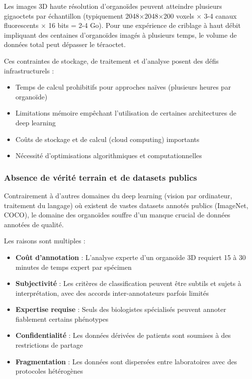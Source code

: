 Les images 3D haute résolution d'organoïdes peuvent atteindre plusieurs gigaoctets par échantillon (typiquement 2048×2048×200 voxels × 3-4 canaux fluorescents × 16 bits = 2-4 Go). Pour une expérience de criblage à haut débit impliquant des centaines d'organoïdes imagés à plusieurs temps, le volume de données total peut dépasser le téraoctet.

Ces contraintes de stockage, de traitement et d'analyse posent des défis infrastructurels :
\begin{itemize}
    \item Temps de calcul prohibitifs pour approches naïves (plusieurs heures par organoïde)
    \item Limitations mémoire empêchant l'utilisation de certaines architectures de deep learning
    \item Coûts de stockage et de calcul (cloud computing) importants
    \item Nécessité d'optimisations algorithmiques et computationnelles
\end{itemize}

\subsubsection{Absence de vérité terrain et de datasets publics}

Contrairement à d'autres domaines du deep learning (vision par ordinateur, traitement du langage) où existent de vastes datasets annotés publics (ImageNet, COCO), le domaine des organoïdes souffre d'un manque crucial de données annotées de qualité.

Les raisons sont multiples :
\begin{itemize}
    \item \textbf{Coût d'annotation} : L'analyse experte d'un organoïde 3D requiert 15 à 30 minutes de temps expert par spécimen
    \item \textbf{Subjectivité} : Les critères de classification peuvent être subtils et sujets à interprétation, avec des accords inter-annotateurs parfois limités
    \item \textbf{Expertise requise} : Seuls des biologistes spécialisés peuvent annoter fiablement certains phénotypes
    \item \textbf{Confidentialité} : Les données dérivées de patients sont soumises à des restrictions de partage
    \item \textbf{Fragmentation} : Les données sont dispersées entre laboratoires avec des protocoles hétérogènes
\end{itemize}

